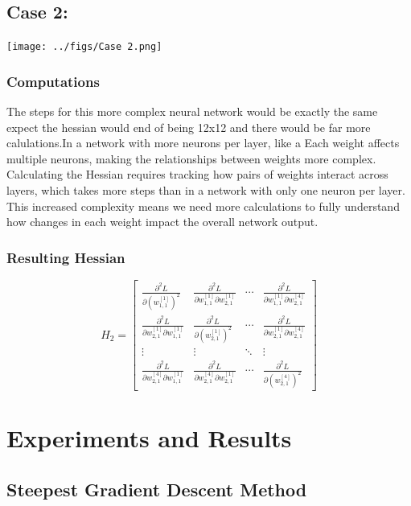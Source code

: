 \documentclass{article}
\begin{document}
\subsection{Case 2:}

\texttt{[image: ../figs/Case 2.png]} \\[0.5cm]

\subsubsection{Computations}
The steps for this more complex neural network would be exactly the same expect the hessian would end of being 12x12 and there would be far more calulations.In a network with more neurons per layer, like a Each weight affects multiple neurons, making the relationships between weights more complex. Calculating the Hessian requires tracking how pairs of weights interact across layers, which takes more steps than in a network with only one neuron per layer. This increased complexity means we need more calculations to fully understand how changes in each weight impact the overall network output.

\subsubsection{Resulting Hessian}
\[
H_2 = \begin{bmatrix}
\frac{\partial^2 L}{\partial (w_{1,1}^{[1]})^2} & \frac{\partial^2 L}{\partial w_{1,1}^{[1]} \partial w_{2,1}^{[1]}} & \cdots & \frac{\partial^2 L}{\partial w_{1,1}^{[1]} \partial w_{2,1}^{[4]}} \\
\frac{\partial^2 L}{\partial w_{2,1}^{[1]} \partial w_{1,1}^{[1]}} & \frac{\partial^2 L}{\partial (w_{2,1}^{[1]})^2} & \cdots & \frac{\partial^2 L}{\partial w_{2,1}^{[1]} \partial w_{2,1}^{[4]}} \\
\vdots & \vdots & \ddots & \vdots \\
\frac{\partial^2 L}{\partial w_{2,1}^{[4]} \partial w_{1,1}^{[1]}} & \frac{\partial^2 L}{\partial w_{2,1}^{[4]} \partial w_{2,1}^{[1]}} & \cdots & \frac{\partial^2 L}{\partial (w_{2,1}^{[4]})^2}
\end{bmatrix}
\]
\section{Experiments and Results}

\subsection{Steepest Gradient Descent Method}
\end{document}
